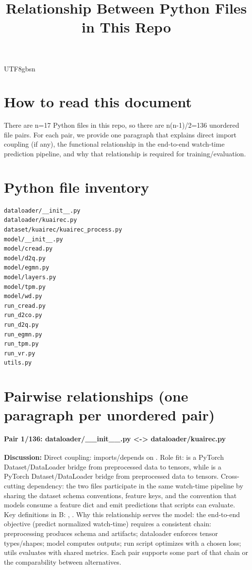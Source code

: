 \documentclass[11pt]{article}
\title{Relationship Between Python Files in This Repo}
\author{}
\date{}
\begin{document}
\begin{CJK*}{UTF8}{gbsn}
\maketitle

\section*{How to read this document}
There are n=17 Python files in this repo, so there are n(n-1)/2=136 unordered file pairs. For each pair, we provide one paragraph that explains direct import coupling (if any), the functional relationship in the end-to-end watch-time prediction pipeline, and why that relationship is required for training/evaluation.

\section*{Python file inventory}
\begin{Verbatim}[fontsize=\small]
dataloader/__init__.py
dataloader/kuairec.py
dataset/kuairec/kuairec_process.py
model/__init__.py
model/cread.py
model/d2q.py
model/egmn.py
model/layers.py
model/tpm.py
model/wd.py
run_cread.py
run_d2co.py
run_d2q.py
run_egmn.py
run_tpm.py
run_vr.py
utils.py
\end{Verbatim}

\section*{Pairwise relationships (one paragraph per unordered pair)}

\paragraph{Pair 1/136: dataloader/\_\_init\_\_.py <-> dataloader/kuairec.py}
\textbf{Discussion:} Direct coupling: \texttt{} imports/depends on \texttt{}. Role fit: \texttt{} is a PyTorch Dataset/DataLoader bridge from preprocessed data to tensors, while \texttt{} is a PyTorch Dataset/DataLoader bridge from preprocessed data to tensors. Cross-cutting dependency: the two files participate in the same watch-time pipeline by sharing the dataset schema conventions, feature keys, and the convention that models consume a feature dict and emit predictions that scripts can evaluate. Key definitions in B: \texttt{}, \texttt{}. Why this relationship serves the model: the end-to-end objective (predict normalized watch-time) requires a consistent chain: preprocessing produces schema and artifacts; dataloader enforces tensor types/shapes; model computes outputs; run script optimizes with a chosen loss; utils evaluates with shared metrics. Each pair supports some part of that chain or the comparability between alternatives.


\end{CJK*}
\end{document}

